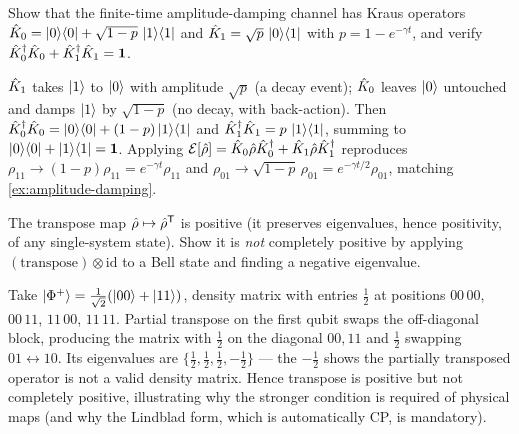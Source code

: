\begin{exercise}
Show that the finite-time amplitude-damping channel has Kraus
operators
$\hat{K}_0=\ket0\!\bra0+\sqrt{1-p}\,\ket1\!\bra1$ and
$\hat{K}_1=\sqrt{p}\,\ket0\!\bra1$ with $p=1-e^{-\gamma t}$, and
verify $\hat{K}_0^\dagger\hat{K}_0+\hat{K}_1^\dagger\hat{K}_1=\mathbf{1}$.
\begin{solution}
$\hat{K}_1$ takes $\ket1$ to $\ket0$ with amplitude $\sqrt p$ (a
decay event); $\hat{K}_0$ leaves $\ket0$ untouched and damps $\ket1$
by $\sqrt{1-p}$ (no decay, with back-action). Then
$\hat{K}_0^\dagger\hat{K}_0=\ket0\!\bra0+(1-p)\ket1\!\bra1$ and
$\hat{K}_1^\dagger\hat{K}_1=p\,\ket1\!\bra1$, summing to
$\ket0\!\bra0+\ket1\!\bra1=\mathbf{1}$. Applying $\mathcal E[\hat{\rho}]
=\hat{K}_0\hat{\rho}\hat{K}_0^\dagger+\hat{K}_1\hat{\rho}\hat{K}_1^\dagger$
reproduces $\rho_{11}\to(1-p)\rho_{11}=e^{-\gamma t}\rho_{11}$ and
$\rho_{01}\to\sqrt{1-p}\,\rho_{01}=e^{-\gamma t/2}\rho_{01}$,
matching \cref{ex:amplitude-damping}.
\end{solution}
\end{exercise}

\begin{exercise}
The transpose map $\hat{\rho}\mapsto\hat{\rho}^{\sf T}$ is positive (it
preserves eigenvalues, hence positivity, of any single-system
state). Show it is \emph{not} completely positive by applying
$(\text{transpose})\otimes\text{id}$ to a Bell state and finding a
negative eigenvalue.
\begin{solution}
Take $\ket{\Phi^+}=\tfrac1{\sqrt2}(\ket{00}+\ket{11})$, density
matrix with entries $\tfrac12$ at positions $00\,00$, $00\,11$,
$11\,00$, $11\,11$. Partial transpose on the first qubit swaps the
off-diagonal block, producing the matrix with $\tfrac12$ on the
diagonal $00,11$ and $\tfrac12$ swapping $01\leftrightarrow10$. Its
eigenvalues are $\{\tfrac12,\tfrac12,\tfrac12,-\tfrac12\}$ --- the
$-\tfrac12$ shows the partially transposed operator is not a valid
density matrix. Hence transpose is positive but not completely
positive, illustrating why the stronger condition is required of
physical maps (and why the Lindblad form, which is automatically
CP, is mandatory).
\end{solution}
\end{exercise}

